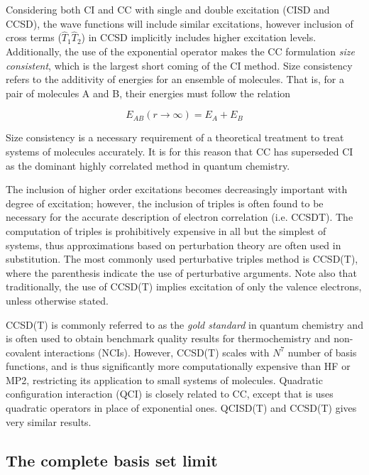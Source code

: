 \noindent Considering both CI and CC with single and double excitation (CISD
and CCSD), the wave functions will include similar excitations, however
inclusion of cross terms ($\hat{T}_1\hat{T}_2$) in CCSD implicitly includes
higher excitation levels. Additionally, the use of the exponential operator
makes the CC formulation \emph{size consistent}, which is the largest short
coming of the CI method. Size consistency refers to the additivity of energies
for an ensemble of molecules. That is, for a pair of molecules A and B, their
energies must follow the relation

\begin{equation}
  E_{AB}(r\rightarrow\infty) = E_A + E_B
\end{equation}

\noindent Size consistency is a necessary requirement of a theoretical
treatment to treat systems of molecules accurately. It is for this reason that
CC has superseded CI as the dominant highly correlated method in quantum
chemistry.

The inclusion of higher order excitations becomes decreasingly important with
degree of excitation; however, the inclusion of triples is often found to be
necessary for the accurate description of electron correlation (i.e. CCSDT).
The computation of triples is prohibitively expensive in all but the simplest
of systems, thus approximations based on perturbation theory are often used in
substitution. The most commonly used perturbative triples method is CCSD(T),
where the parenthesis indicate the use of perturbative arguments. Note also
that traditionally, the use of CCSD(T) implies excitation of only the valence
electrons, unless otherwise stated.

CCSD(T) is commonly referred to as the \emph{gold standard} in quantum chemistry
and is often used to obtain benchmark quality results for thermochemistry and
non-covalent interactions (NCIs).\cite{Levine2013} However, CCSD(T) scales with
$N^7$ number of basis functions, and is thus significantly more computationally
expensive than HF or MP2, restricting its application to small systems of
molecules. Quadratic configuration interaction (QCI) is closely related to CC,
except that is uses quadratic operators in place of exponential ones. QCISD(T)
and CCSD(T) gives very similar results.\cite{Pople1987}

\subsection{The complete basis set limit}

